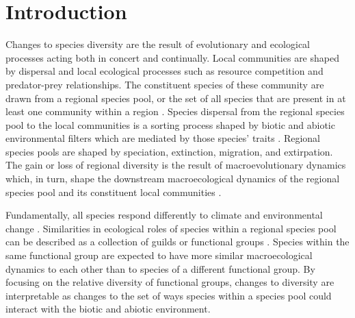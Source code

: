 \documentclass[12pt,letterpaper]{article}
\begin{document}
\section*{Introduction}
Changes to species diversity are the result of evolutionary and ecological processes acting both in concert and continually. Local communities are shaped by dispersal and local ecological processes such as resource competition and predator-prey relationships. The constituent species of these community are drawn from a regional species pool, or the set of all species that are present in at least one community within a region \citep{Mittelbach2015a,Urban2008,Harrison2008}. Species dispersal from the regional species pool to the local communities is a sorting process shaped by biotic and abiotic environmental filters which are mediated by those species' traits \citep{Shipley2006,Elith2009,Urban2008,Loeuille2008,Cottenie2005,Harrison2008}. Regional species pools are shaped by speciation, extinction, migration, and extirpation. The gain or loss of regional diversity is the result of macroevolutionary dynamics which, in turn, shape the downstream macroecological dynamics of the regional species pool and its constituent local communities \citep{Urban2008,Mittelbach2015a,Harrison2008}. 

Fundamentally, all species respond differently to climate and environmental change \citep{Blois2009}. Similarities in ecological roles of species within a regional species pool can be described as a collection of guilds or functional groups \citep{Valentine1969,Bambach1977,Brown1989,Simberloff1991a,Wilson1999}. Species within the same functional group are expected to have more similar macroecological dynamics to each other than to species of a different functional group. By focusing on the relative diversity of functional groups, changes to diversity are interpretable as changes to the set of ways species within a species pool could interact with the biotic and abiotic environment. 
\end{document}
